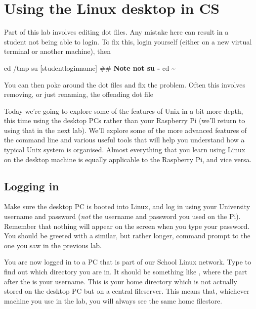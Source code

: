 \chapter{Using the Linux desktop in CS}

\minitoc


\begin{demonote}
  Part of this lab involves editing dot files. Any mistake here can result in a student not being able to login. To fix this, login yourself (either on a new virtual terminal or another machine), then
  \begin{ttoutenv}
    cd /tmp
    su [studentloginname]  ## \textbf{Note not su -}
    cd \textasciitilde
  \end{ttoutenv}
  You can then poke around the dot files and fix the problem. Often this involves removing, or just renaming, the offending dot file

\end{demonote}

Today we're going to explore some of the features of Unix in a bit more depth, this time using the desktop PCs rather than your Raspberry Pi (we'll return to using that in the next lab). We'll explore some of the more advanced features of the command line and various useful tools that will help you understand how a typical Unix system is organised. Almost everything that you learn using Linux on the desktop machine is equally applicable to the Raspberry Pi, and vice versa. 

\section{Logging in}

 Make sure the desktop PC is booted into Linux, and log in using your University username and password (\emph{not} the username and password you used on the Pi). Remember that nothing will appear on the screen when you type your password. You should be greeted with a similar, but rather longer, command prompt to the one you saw in the previous lab.

 You are now logged in to a PC that is part of our School Linux network. Type  to find out which directory you are in. It should be something like , where the part after the \ttout{/} is your username. This is your home directory which is not actually stored on the desktop PC but on a central fileserver. This means that, whichever machine you use in the lab, you will always see the same home filestore. 

